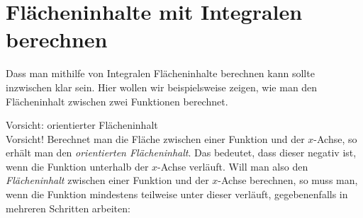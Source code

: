 \section{Flächeninhalte mit Integralen berechnen}

Dass man mithilfe von Integralen Flächeninhalte berechnen kann sollte inzwischen klar sein. Hier wollen wir beispielsweise zeigen, wie man den Flächeninhalt zwischen zwei Funktionen berechnet.

\begin{bla}{Vorsicht: orientierter Flächeninhalt}\  \\
  Vorsicht! Berechnet man die Fläche zwischen einer Funktion und der $x$-Achse, so erhält man den \emph{orientierten Flächeninhalt}. Das bedeutet, dass dieser negativ ist, wenn die Funktion unterhalb der $x$-Achse verläuft. Will man also den \emph{Flächeninhalt} zwischen einer Funktion und der $x$-Achse berechnen, so muss man, wenn die Funktion mindestens teilweise unter dieser verläuft, gegebenenfalls in mehreren Schritten arbeiten:
\end{bla}

